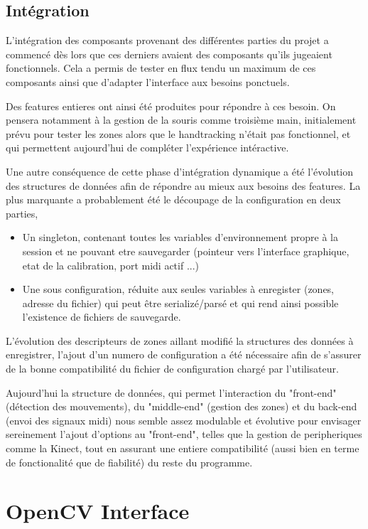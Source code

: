 \subsection{Intégration}
\par L'intégration des composants provenant des différentes parties du projet a commencé dès lors que ces derniers avaient des composants qu'ils jugeaient fonctionnels. Cela a permis de tester en flux tendu un maximum de ces composants ainsi que d'adapter l'interface aux besoins ponctuels.
\par Des features entieres ont ainsi été produites pour répondre à ces besoin. On pensera notamment à la gestion de la souris comme troisième main, initialement prévu pour tester les zones alors que le handtracking n'était pas fonctionnel, et qui permettent aujourd'hui de compléter l'expérience intéractive.
\par Une autre conséquence de cette phase d'intégration dynamique a été l'évolution des structures de données afin de répondre au mieux aux besoins des features. La plus marquante a probablement été le découpage de la configuration en deux parties, 
\begin{itemize}
    \item Un singleton, contenant toutes les variables d'environnement propre à la session et ne pouvant etre sauvegarder (pointeur vers l'interface graphique, etat de la calibration, port midi actif ...)
    \item Une sous configuration, réduite aux seules variables à enregister (zones, adresse du fichier) qui peut être serializé/parsé et qui rend ainsi possible l'existence de fichiers de sauvegarde.
\end{itemize}
\par L'évolution des descripteurs de zones aillant modifié la structures des données à enregistrer, l'ajout d'un numero de configuration a été nécessaire afin de s'assurer de la bonne compatibilité du fichier de configuration chargé par l'utilisateur.
\par Aujourd'hui la structure de données, qui permet l'interaction du "front-end" (détection des mouvements), du "middle-end" (gestion des zones) et du back-end (envoi des signaux midi) nous semble assez modulable et évolutive pour envisager sereinement l'ajout d'options au "front-end", telles que la gestion de peripheriques comme la Kinect, tout en assurant une entiere compatibilité (aussi bien en terme de fonctionalité que de fiabilité) du reste du programme.
\section*{OpenCV Interface}
